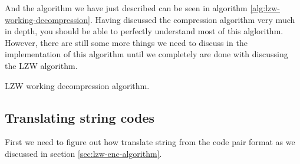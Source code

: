\begin{refsection}
And the algorithm we have just described can be seen in algorithm
\ref{alg:lzw-working-decompression}. Having discussed the compression
algorithm very much in depth, you should be able to perfectly
understand most of this alglorithm. However, there are still some more
things we need to discuss in the implementation of this algorithm
until we completely are done with discussing the LZW algorithm.

\begin{algorithm}[H]
  \caption{LZW working decompression algorithm.}
  \label{alg:lzw-working-decompression}
  \begin{algorithmic}[1]

    \State {}

    \State {}




       
      \Else
      \EndIf

      \State {}

       

        \State {}

      \EndIf



    \EndWhile
  \end{algorithmic}
\end{algorithm}

\subsection{Translating string codes}

First we need to figure out how translate string from the code pair format as we
discussed in section \ref{sec:lzw-enc-algorithm}.


\end{refsection}
